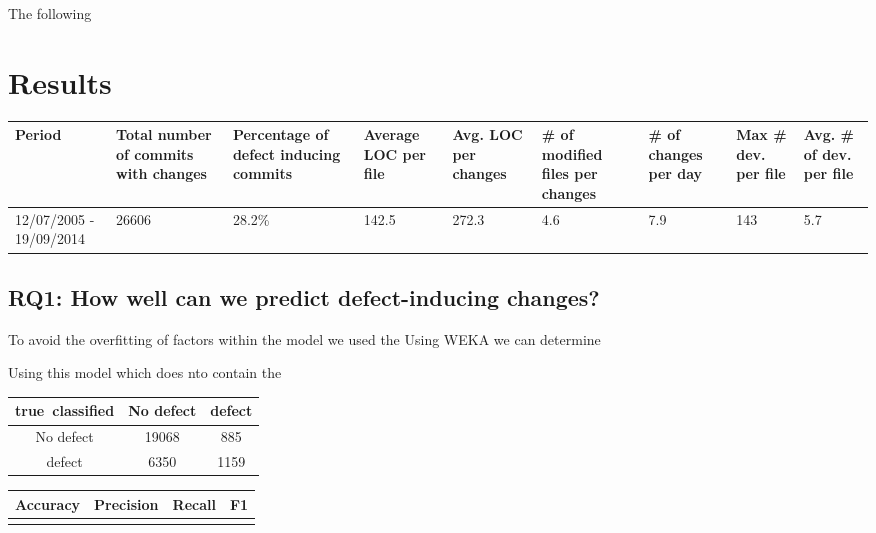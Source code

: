 \documentclass[10pt, conference]{IEEEtran}
\begin{document}
The following 



\section{Results}
\label{sec:results}

\begin{table}
	\begin{tabular}{|p{2 cm}|p{1.5 cm}|p{1.5 cm}|p{1.5 cm}|p{1.5 cm}|p{1.5 cm}|p{1.5 cm}|p{1.5 cm}|p{1.5 cm}|}
		\hline 
		Period  & Total number of commits with changes  & Percentage of defect inducing commits  & Average LOC per file  & Avg. LOC per changes  & \# of modified files per changes  & \# of changes per day  & Max \# dev. per file  & Avg. \# of dev. per file \tabularnewline
		\hline 
		12/07/2005 - 19/09/2014  & 26606  & 28.2\% & 142.5 & 272.3 & 4.6 & 7.9 & 143 & 5.7 \\ \hline 
	\end{tabular}
	\label{table:statistics}	
\end{table}

\subsection{RQ1: How well can we predict defect-inducing changes?}
\label{sec:rq1}


To avoid the overfitting of factors within the model we used the Using WEKA we can determine 

Using this model which does nto contain the 
\begin{table}
	
	\begin{tabular}{|c|c|c|}
		\hline 
		true\ classified  & No defect  & defect \tabularnewline
		\hline 
		No defect  & 19068  & 885 \tabularnewline
		\hline 
		defect  & 6350  & 1159 \tabularnewline
		\hline 
	\end{tabular}
	\label{table:confusion}
\end{table}

\begin{table}
	\begin{tabular}{|c|c|c|c|}
		\hline Accuracy & Precision & Recall & F1 \\ 
		\hline  &  &  &  \\ 
		\hline 
	\end{tabular}
	
	\label{table:prediction} 
\end{table}
\end{document}

